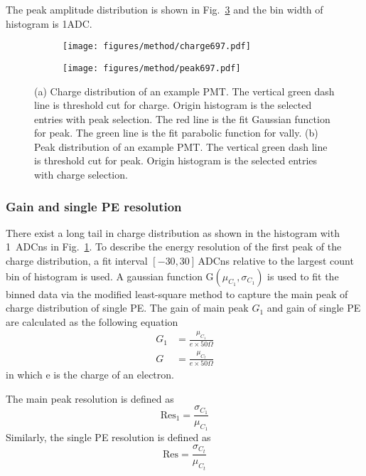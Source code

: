 The peak amplitude distribution is shown in Fig.~\ref{fig:peak} and the bin width of histogram is 1ADC.
\begin{figure}[!htbp]
    \centering
    \begin{subfigure}[t]{0.49\textwidth}
        \texttt{[image: figures/method/charge697.pdf]}
        \caption{}%
        \label{fig:charge}
    \end{subfigure}
    \begin{subfigure}[t]{0.49\textwidth}
        \texttt{[image: figures/method/peak697.pdf]}
        \caption{}%
        \label{fig:peak}
    \end{subfigure}
    \caption{(a) Charge distribution of an example PMT. The vertical green dash line is threshold cut for charge. Origin histogram is the selected entries with peak selection. The red line is the fit Gaussian function for peak. The green line is the fit parabolic function for vally. (b) Peak distribution of an example PMT. The vertical green dash line is threshold cut for peak. Origin histogram is the selected entries with charge selection.}
\end{figure}
\subsubsection{Gain and single PE resolution}
\label{sec:noisegain}
There exist a long tail in charge distribution as shown in the histogram with \SI{1}{ADCns} in Fig.~\ref{fig:charge}. To describe the energy resolution of the first peak of the charge distribution, a fit interval $[-30, 30]$\,ADCns relative to the largest count bin of histogram is used. A gaussian function G$(\mu_{C_1},\sigma_{C_1})$ is used to fit the binned data via the modified least-square method to capture the main peak of charge distribution of single PE. The gain of main peak $G_1$ and gain of single PE are calculated as the following equation
\begin{align}
    G_1&=\frac{\mu_{C_1}}{e\times 50\Omega} \\
    G &= \frac{\mu_{C_t}}{e\times 50\Omega}
\end{align}
in which e is the charge of an electron.

The main peak resolution is defined as
\begin{equation}
    \mathrm{Res}_1=\frac{\sigma_{C_1}}{\mu_{C_1}}
\end{equation}
Similarly, the single PE resolution is defined as
\begin{equation}
    \mathrm{Res}=\frac{\sigma_{C_t}}{\mu_{C_t}}
\end{equation}
